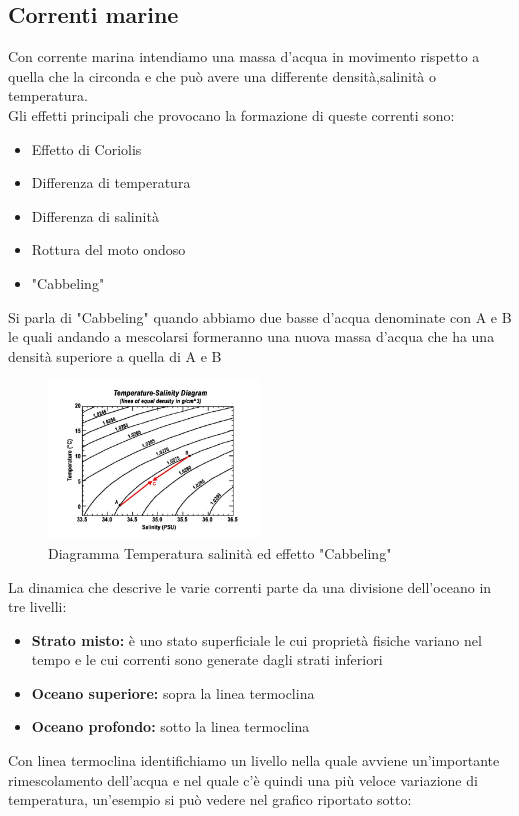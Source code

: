\subsection{Correnti marine}
Con corrente marina intendiamo una massa d'acqua in movimento rispetto a quella che la circonda e che può avere una differente densità,salinità o temperatura.\\
Gli effetti principali che provocano la formazione di queste correnti sono:\cite{NOAA-current}
\begin{itemize}
    \item Effetto di Coriolis
    \item Differenza di temperatura
    \item Differenza di salinità
    \item Rottura del moto ondoso
    \item "Cabbeling"
\end{itemize}\noindent
Si parla di "Cabbeling" quando abbiamo due basse d'acqua denominate con A e B le quali andando a mescolarsi formeranno una nuova massa d'acqua che ha una densità superiore a quella di A e B
\begin{figure}[H]
    \centering
    \includegraphics[width=0.5\textwidth]{res/cap2/temperature-salinity.png}
    \caption{Diagramma Temperatura salinità ed effetto "Cabbeling"}
\end{figure}\noindent
La dinamica che descrive le varie correnti parte da una divisione dell'oceano in tre livelli:
\begin{itemize}
    \item \textbf{Strato misto:} è uno stato superficiale le cui proprietà fisiche variano nel tempo e le cui correnti sono generate dagli strati inferiori
    \item \textbf{Oceano superiore:} sopra la linea termoclina
    \item \textbf{Oceano profondo:}  sotto la linea termoclina
\end{itemize}\noindent
Con linea termoclina identifichiamo un livello nella quale avviene un'importante rimescolamento dell'acqua e nel quale c'è quindi una più veloce variazione di temperatura, un'esempio si può vedere nel grafico riportato sotto:
